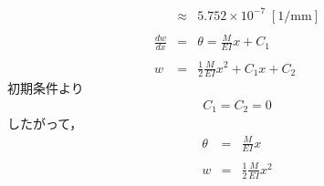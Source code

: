\documentclass[twocolumn,a4j]{jsarticle}
\begin{document}
\begin{itemize}
\begin{eqnarray*}
        &\approx& 5.752 × 10^{-7} \;\left[\mathrm{1/mm}\right]\\ \\
        \frac{dw}{dx} &=& \theta = \frac{M}{EI} x + C_1\\ \\
        w &=& \frac{1}{2} \frac{M}{EI} x^2 + C_1x + C_2
    \end{eqnarray*}
    初期条件より
    \begin{eqnarray*}
        C_1 = C_2 = 0
    \end{eqnarray*}
    したがって，
    \begin{eqnarray*}
        \theta &=& \frac{M}{EI}x\\ \\
        w &=& \frac{1}{2}\frac{M}{EI}x^2\\
    \end{eqnarray*}
\end{itemize}
\newpage
\end{document}
